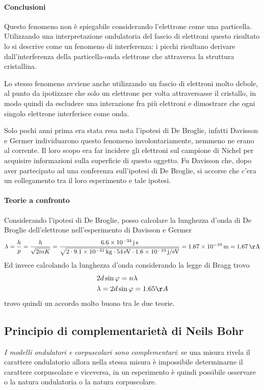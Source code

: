 \paragraph{Conclusioni}
Questo fenomeno non è spiegabile considerando l'elettrone come una particella.
Utilizzando una interpretazione ondulatoria del fascio di elettroni questo risultato lo si descrive come un fenomeno di interferenza:
i picchi risultano derivare dall'interferenza della particella-onda elettrone che attraversa la struttura cristallina.

Lo stesso fenomeno avviene anche utilizzando un fascio di elettroni molto debole, al punto da ipotizzare che solo un elettrone per volta attraversasse il cristallo, in modo quindi da escludere una interazione fra più elettroni e dimostrare che ogni singolo elettrone interferisce come onda.

Solo pochi anni prima era stata resa nota l'ipotesi di De Broglie, infatti Davisson e Germer individuarono questo fenomeno involontariamente, nemmeno ne erano al corrente.
Il loro scopo era far incidere gli elettroni sul campione di Nichel per acquisire informazioni sulla superficie di questo oggetto.
Fu Davisson che, dopo aver partecipato ad una conferenza sull'ipotesi di De Broglie, si accorse che c'era un collegamento tra il loro esperimento e tale ipotesi.

\paragraph{Teorie a confronto}
Considerando l'ipotesi di De Broglie, posso calcolare la lunghezza d'onda di De Broglie dell'elettrone nell'esperimento di Davisson e Germer
\begin{equation}
\lambda = \frac{ h}{p } = \frac{ h}{\sqrt{2mK} } 
= \frac{\SI{6.6e-34}{j.s} }{\sqrt{ 2 \cdot \SI{9.1e-31}{kg} \cdot \SI{54}{eV} \cdot \SI{1.6e-19}{j / eV} } } 
= \SI{1.67e-10}{m} = \SI{1.67}{\AA}
\end{equation}
Ed invece calcolando la lunghezza d'onda considerando la legge di Bragg trovo
\begin{equation}
\begin{split}
& 2 d \sin \varphi = n \lambda \\
& \lambda = 2 d \sin \varphi = 1.65 \AA
\end{split}
\end{equation}
trovo quindi un accordo molto buono tra le due teorie.


\subsection{Principio di complementarietà di Neils Bohr}
\textit{I modelli ondulatori e corpuscolari sono complementari}: se una misura rivela il carattere ondulatorio allora nella stessa misura è impossibile determinarne il carattere corpuscolare e viceversa, in un esperimento è quindi possibile osservare o la natura ondulatoria o la natura corpuscolare.

